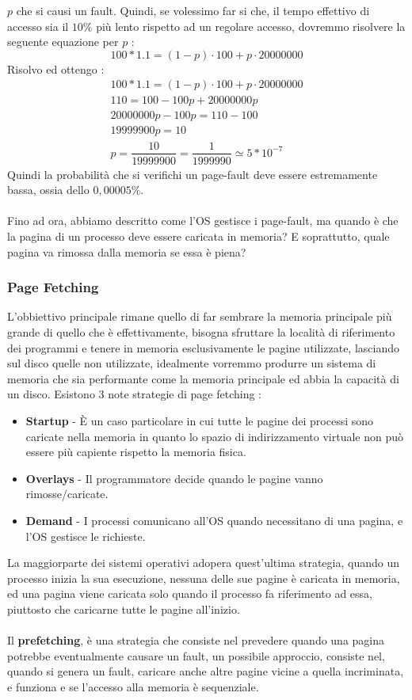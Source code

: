 \documentclass[12pt, letterpaper]{article}
\newcommand{\acc}{\\\hphantom{}\\}
\begin{document}
\(p\) che si causi un fault. Quindi, se volessimo far si che, il tempo effettivo di accesso sia il \(10\%\) più lento 
rispetto ad un regolare accesso, dovremmo risolvere la seguente equazione per \(p\) : 
$$100*1.1=(1-p)\cdot 100 + p\cdot 20000000$$
Risolvo ed ottengo : \begin{gather*}
    100*1.1=(1-p)\cdot 100 + p\cdot 20000000\\ 110=100-100p + 20000000p\\ 
    20000000p-100p=110-100\\19999900p=10\\p=\dfrac{10}{19999900}=\dfrac{1}{1999990}\simeq5*10^{-7}
\end{gather*}
Quindi la probabilità che si verifichi un page-fault deve essere estremamente bassa, ossia dello $0,00005 \%$.\acc
Fino ad ora, abbiamo descritto come l'OS gestisce i page-fault, ma quando è che la pagina di un processo deve essere 
caricata in memoria? E soprattutto, quale pagina va rimossa dalla memoria se essa è piena?
\subsubsection{Page Fetching}
L'obbiettivo principale rimane quello di far sembrare la memoria principale più grande di quello che è effettivamente,
bisogna sfruttare la località di riferimento dei programmi e tenere in memoria esclusivamente le pagine utilizzate, lasciando 
sul disco quelle non utilizzate, idealmente vorremmo produrre un sistema di memoria che sia performante come la memoria 
principale ed abbia la capacità di un disco. Esistono 3 note strategie di page fetching : \begin{itemize}
    \item \textbf{Startup} - È un caso particolare in cui tutte le pagine dei processi sono caricate nella memoria 
    in quanto lo spazio di indirizzamento virtuale non può essere più capiente rispetto la memoria fisica.
    \item \textbf{Overlays} - Il programmatore decide quando le pagine vanno rimosse/caricate. 
    \item \textbf{Demand} - I processi comunicano all'OS quando necessitano di una pagina, e l'OS gestisce le richieste.
\end{itemize}
La maggiorparte dei sistemi operativi adopera quest'ultima strategia, quando un processo inizia la sua esecuzione, nessuna 
delle sue pagine è caricata in memoria, ed una pagina viene caricata solo quando il processo fa riferimento ad essa, piuttosto che 
caricarne tutte le pagine all'inizio.\acc Il \textbf{prefetching}, è una strategia che consiste nel prevedere 
quando una pagina potrebbe eventualmente causare un fault, un possibile approccio, consiste nel, quando si genera 
un fault, caricare anche altre pagine vicine a quella incriminata, e funziona e se l'accesso alla memoria è sequenziale.
\end{document}
